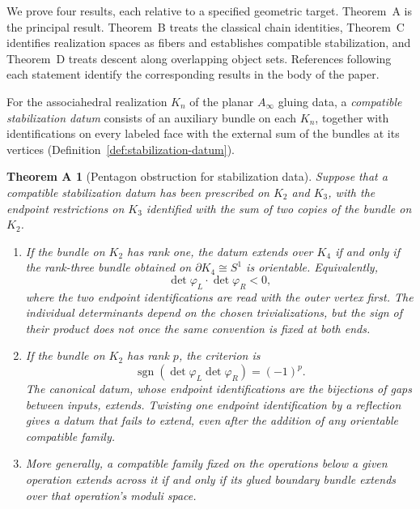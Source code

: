 \documentclass[11pt,letterpaper,twoside]{article}
\theoremstyle{plain}
\newtheorem*{theoremA}{Theorem A}
\theoremstyle{definition}
\theoremstyle{remark}
\newcommand{\Ainf}{A_\infty}
\begin{document}
We prove four results, each relative to a specified geometric target.  Theorem~A is the principal result.  Theorem~B treats the classical chain identities, Theorem~C identifies realization spaces as fibers and establishes compatible stabilization, and Theorem~D treats descent along overlapping object sets.  References following each statement identify the corresponding results in the body of the paper.

For the associahedral realization \(K_n\) of the planar \(\Ainf\) gluing data, a \emph{compatible stabilization datum} consists of an auxiliary bundle on each \(K_n\), together with identifications on every labeled face with the external sum of the bundles at its vertices (Definition~\ref{def:stabilization-datum}).

\begin{theoremA}[Pentagon obstruction for stabilization data]
Suppose that a compatible stabilization datum has been prescribed on \(K_2\) and \(K_3\), with the endpoint restrictions on \(K_3\) identified with the sum of two copies of the bundle on \(K_2\).
\begin{enumerate}
\item If the bundle on \(K_2\) has rank one, the datum extends over \(K_4\) if and only if the rank-three bundle obtained on \(\partial K_4\cong S^1\) is orientable.  Equivalently,
\[
 \det\varphi_L\cdot\det\varphi_R<0,
\]
where the two endpoint identifications are read with the outer vertex first.  The individual determinants depend on the chosen trivializations, but the sign of their product does not once the same convention is fixed at both ends.
\item If the bundle on \(K_2\) has rank \(p\), the criterion is
\[
 \operatorname{sgn}(\det\varphi_L\det\varphi_R)=(-1)^p.
\]
The canonical datum, whose endpoint identifications are the bijections of gaps between inputs, extends.  Twisting one endpoint identification by a reflection gives a datum that fails to extend, even after the addition of any orientable compatible family.
\item More generally, a compatible family fixed on the operations below a given operation extends across it if and only if its glued boundary bundle extends over that operation's moduli space.
\end{enumerate}
\end{theoremA}
\end{document}
